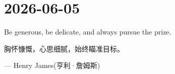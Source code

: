 \section*{2026-06-05}
Be generous, be delicate, and always pursue the prize.\par
胸怀慷慨，心思细腻，始终瞄准目标。 \par
\hfill --- Henry James(亨利·詹姆斯) \par

